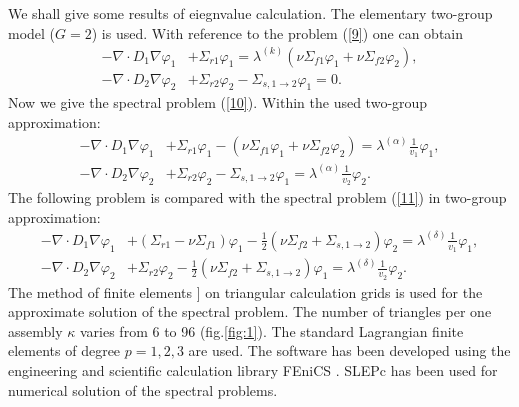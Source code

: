 \documentclass[authoryear]{elsarticle}
\begin{document}
We shall give some results of eiegnvalue calculation. The elementary two-group model ($G = 2$) is used. With reference to the problem  (\ref{9}) 
one can obtain
\begin{equation}\label{17}
\begin{split}
 - \nabla \cdot D_1 \nabla \varphi_1 & + \Sigma_{r1} \varphi_1  
 = \lambda^{(k)} (\nu \Sigma_{f1} \varphi_1 + \nu \Sigma_{f2} \varphi_2), \\
 - \nabla \cdot D_2 \nabla \varphi_2 & + \Sigma_{r2} \varphi_2 - \Sigma_{s,1\rightarrow 2} \varphi_1  
 = 0.
\end{split}
\end{equation}
Now we give the spectral problem (\ref{10}). Within the used two-group approximation:
\begin{equation}\label{18}
\begin{split}
 - \nabla \cdot D_1 \nabla \varphi_1 & + \Sigma_{r1} \varphi_1    
 - (\nu \Sigma_{f1} \varphi_1 + \nu \Sigma_{f2} \varphi_2) = \lambda^{(\alpha)} \frac{1}{v_1}   \varphi_1, \\
 - \nabla \cdot D_2 \nabla \varphi_2 & + \Sigma_{r2} \varphi_2 - \Sigma_{s,1\rightarrow 2} \varphi_1  
 = \lambda^{(\alpha)} \frac{1}{v_2}   \varphi_2.
\end{split}
\end{equation}
The following problem is compared with the spectral problem (\ref{11}) in two-group approximation:
\begin{equation}\label{19}
\begin{split}
 - \nabla \cdot D_1 \nabla \varphi_1 & + (\Sigma_{r1} - \nu \Sigma_{f1}) \varphi_1 - \frac{1}{2}  (\nu \Sigma_{f2} + \Sigma_{s,1\rightarrow 2}) \varphi_2  = \lambda^{(\delta)} \frac{1}{v_1}   \varphi_1, \\
 - \nabla \cdot D_2 \nabla \varphi_2 & + \Sigma_{r2} \varphi_2 
 - \frac{1}{2}  (\nu \Sigma_{f2} + \Sigma_{s,1\rightarrow 2}) \varphi_1 
 = \lambda^{(\delta )} \frac{1}{v_2}   \varphi_2.
\end{split}
\end{equation} 
The method of finite elements \cite{brenner,quarteroni} 
] on triangular calculation grids is used for the approximate solution of the spectral problem. The number of triangles per one assembly $\kappa$  varies from 6 to 96 (fig.\ref{fig:1}).
The standard Lagrangian finite elements of degree $p=1,2,3$ are used.
The software has been developed using the engineering and scientific calculation library FEniCS \cite{fenics}. SLEPc \cite{hernandez2003resolution,hernandez2005slepc} has been used for numerical solution of the spectral problems.  
\end{document}
